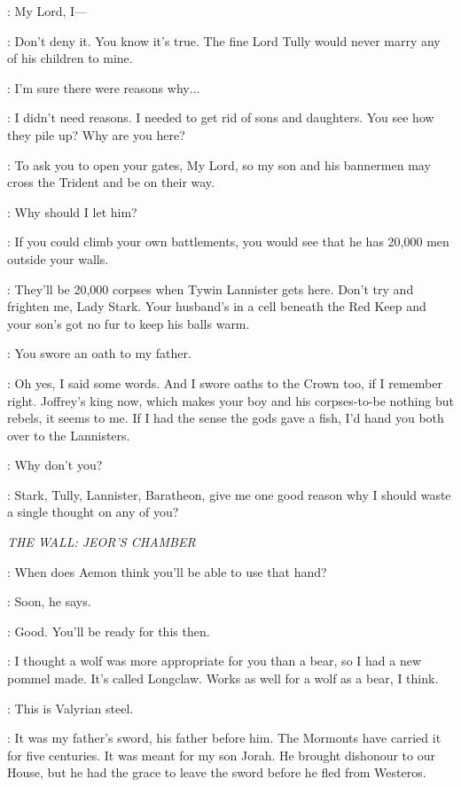 \CATELYN: My Lord, I--- 

\FREY: Don't deny it. You know it's true. The fine Lord Tully would never marry any of his children to mine. 

\CATELYN: I'm sure there were reasons why$\ldots$  

\FREY: I didn't need reasons. I needed to get rid of sons and daughters. You see how they pile up? Why are you here? 

\CATELYN: To ask you to open your gates, My Lord, so my son and his bannermen may cross the Trident and be on their way. 

\FREY: Why should I let him? 

\CATELYN: If you could climb your own battlements, you would see that he has 20,000 men outside your walls. 

\FREY: They'll be 20,000 corpses when Tywin Lannister gets here. Don't try and frighten me, Lady Stark. Your husband's in a cell beneath the Red Keep and your son's got no fur to keep his balls warm. 

\CATELYN: You swore an oath to my father. 

\FREY: Oh yes, I said some words. And I swore oaths to the Crown too, if I remember right. Joffrey's king now, which makes your boy and his corpses-to-be nothing but rebels, it seems to me. If I had the sense the gods gave a fish, I'd hand you both over to the Lannisters. 

\CATELYN: Why don't you? 

\FREY: Stark, Tully, Lannister, Baratheon, give me one good reason why I should waste a single thought on any of you? 


\scene

\textit{THE WALL: JEOR'S CHAMBER} 


\JEOR: When does Aemon think you'll be able to use that hand? 

\JON: Soon, he says. 

\JEOR: Good. You'll be ready for this then. 


\JEOR: I thought a wolf was more appropriate for you than a bear, so I had a new pommel made. It's called Longclaw. Works as well for a wolf as a bear, I think. 

\JON: This is Valyrian steel. 

\JEOR: It was my father's sword, his father before him. The Mormonts have carried it for five centuries. It was meant for my son Jorah. He brought dishonour to our House, but he had the grace to leave the sword before he fled from Westeros. 

